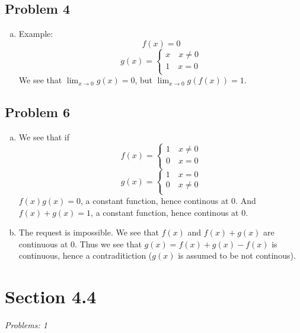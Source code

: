 \documentclass[12pt]{article}
\begin{document}
\subsection*{Problem 4}
\begin{enumerate}[a).]
    \item {
        Example: \\
        $$ 
        f(x) = 0
        $$
        $$ 
        g(x) = \left\{ 
            \begin{array}{ll} 
                x \quad   x \ne 0\\
                1 \quad   x = 0\\
            \end{array} \right.
        $$
        We see that $\lim_{x\rightarrow 0}g(x) = 0$, but $\lim_{x\rightarrow 0} g(f(x))= 1$. 

    }
\end{enumerate}

\subsection*{Problem 6}
\begin{enumerate}[a).]
    \item {
        We see that if 
        $$
        f(x) = \left\{
            \begin{array}{ll}
                1 \quad x \ne 0 \\
                0 \quad x = 0\\
            \end{array} \right.
        $$
        $$
        g(x) = \left\{
            \begin{array}{ll}
                1 \quad x = 0 \\
                0 \quad x \ne 0\\
            \end{array} \right.
        $$
        $f(x)g(x) = 0$, a constant function, hence continous at $0$. 
        And $f(x) + g(x) = 1$, a constant function, hence continous at $0$. 
    }
    \item {
        The request is impossible. 
        We see that $f(x)$ and $f(x) + g(x)$ are continuous at 0. Thus we see that $g(x) = f(x) + g(x) - f(x)$ is continuous, hence a contraditiction ($g(x)$ is assumed to be not continous). 
    }
\end{enumerate}

\section*{Section 4.4}
\textit{Problems: 1}
\end{document}
